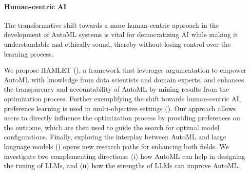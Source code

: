 \paragraph{Human-centric AI}
The transformative shift towards a more human-centric approach in the development of AutoML systems is vital for democratizing AI while making it understandable and ethically sound, thereby without losing control over the learning process.

We propose HAMLET (), a framework that leverages argumentation to empower AutoML with knowledge from data scientists and domain experts, and enhances the transparency and accountability of AutoML by mining results from the optimization process.
Further exemplifying the shift towards human-centric AI, preference learning is used in multi-objective settings ().
Our approach allows users to directly influence the optimization process by providing preferences on the outcome, which are then used to guide the search for optimal model configurations.
Finally, exploring the interplay between AutoML and large language models () opens new research paths for enhancing both fields.
We investigate two complementing directions: (i) how AutoML can help in designing the tuning of LLMs, and (ii) how the strengths of LLMs can improve AutoML.

